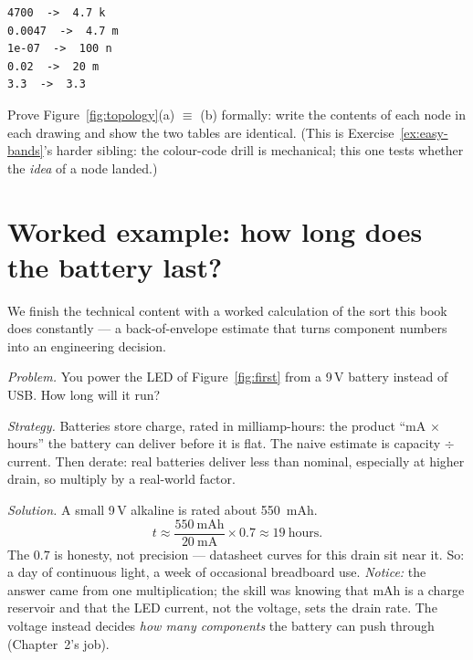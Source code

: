 \begin{lstlisting}[language={},numbers=none,caption={Real output of
\texttt{python3 code/prefix.py}. Compare the third line: $10^{-7}$ F is
the ceramic-disc capacitor marked ``104'' you will meet in Chapter~4.},
label={lst:prefix-out}]
4700  ->  4.7 k
0.0047  ->  4.7 m
1e-07  ->  100 n
0.02  ->  20 m
3.3  ->  3.3
\end{lstlisting}

\begin{exercise}[medium]
Prove Figure~\ref{fig:topology}(a) $\equiv$ (b) formally: write the contents
of each node in each drawing and show the two tables are identical. (This is
Exercise~\ref{ex:easy-bands}'s harder sibling: the colour-code drill is
mechanical; this one tests whether the \emph{idea} of a node landed.)
\end{exercise}

\section{Worked example: how long does the battery last?}
\label{sec:battery}

We finish the technical content with a worked calculation of the sort this
book does constantly — a back-of-envelope estimate that turns component numbers
into an engineering decision.

\begin{example}
\label{ex:battery}
\emph{Problem.} You power the LED of Figure~\ref{fig:first} from a 9\,V
battery instead of USB. How long will it run?\par
\emph{Strategy.} Batteries store charge, rated in
milliamp-hours: the product ``mA $\times$ hours'' the
battery can deliver before it is flat. The naive estimate is capacity
$\div$ current. Then derate: real batteries deliver less than nominal,
especially at higher drain, so multiply by a real-world factor.\par
\emph{Solution.} A small 9\,V alkaline is rated about 550~mAh.
\[
  t \approx \frac{550\ \text{mAh}}{20\ \text{mA}} \times 0.7
    \approx 19\ \text{hours}.
\]
The $0.7$ is honesty, not precision — datasheet curves for this drain sit near
it. So: a day of continuous light, a week of occasional breadboard use.
\emph{Notice:} the answer came from one multiplication; the skill was knowing
that mAh is a charge reservoir and that the LED current, not the voltage, sets
the drain rate. The voltage instead decides \emph{how many components} the
battery can push through (Chapter~2's job).
\end{example}

